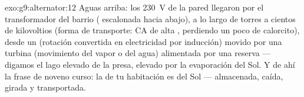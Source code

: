 \begin{solution}{exo:g9:alternator:12}
Aguas arriba: los \qty{230}{V} de la pared llegaron por el
transformador del barrio ( escalonada hacia abajo), a lo
largo de torres a cientos de kilovoltios (forma de transporte: CA de
alta , perdiendo un poco de calorcito), desde un
 (rotación convertida en electricidad por inducción)
movido por una turbina (movimiento del vapor o del agua) alimentada por
una reserva --- digamos el lago elevado de la presa, elevado por la
evaporación del Sol. Y de ahí la frase de noveno curso: la
 de tu habitación es  del Sol --- almacenada, caída, girada y
transportada.
\end{solution}

